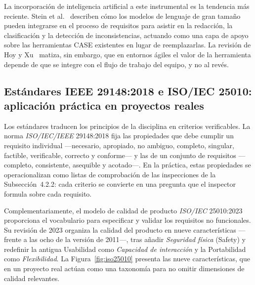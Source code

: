\documentclass[11pt,a4paper,oneside]{report}
\begin{document}
	La incorporaci\'on de inteligencia artificial a este instrumental es la tendencia m\'as reciente. Stein et al.~\citep{stein_llm_re_2026} describen c\'omo los modelos de lenguaje de gran tama\~no pueden integrarse en el proceso de requisitos para asistir en la redacci\'on, la clasificaci\'on y la detecci\'on de inconsistencias, actuando como una capa de apoyo sobre las herramientas CASE existentes en lugar de reemplazarlas. La revisi\'on de Hoy y Xu~\citep{hoy_agile_re_2023} matiza, sin embargo, que en entornos \'agiles el valor de la herramienta depende de que se integre con el flujo de trabajo del equipo, y no al rev\'es.
	
	\subsection{Est\'andares IEEE 29148:2018 e ISO/IEC 25010: aplicaci\'on pr\'actica en proyectos reales}
	
	Los est\'andares traducen los principios de la disciplina en criterios verificables. La norma \textit{ISO/IEC/IEEE} 29148:2018 \citep{iso29148_2018} fija las propiedades que debe cumplir un requisito individual ---necesario, apropiado, no ambiguo, completo, singular, factible, verificable, correcto y conforme--- y las de un conjunto de requisitos ---completo, consistente, asequible y acotado---. En la pr\'actica, estas propiedades se operacionalizan como listas de comprobaci\'on de las inspecciones de la Subsecci\'on~4.2.2: cada criterio se convierte en una pregunta que el inspector formula sobre cada requisito.
	
	Complementariamente, el modelo de calidad de producto \textit{ISO/IEC} 25010:2023 \citep{iso25010_2023} proporciona el vocabulario para especificar y validar los requisitos no funcionales. Su revisi\'on de 2023 organiza la calidad del producto en nueve caracter\'isticas ---frente a las ocho de la versi\'on de 2011---, tras a\~nadir \textit{Seguridad f\'isica} (Safety) y redefinir la antigua Usabilidad como \textit{Capacidad de interacci\'on} y la Portabilidad como \textit{Flexibilidad}. La Figura~\ref{fig:iso25010} presenta las nueve caracter\'isticas, que en un proyecto real act\'uan como una taxonom\'ia para no omitir dimensiones de calidad relevantes.
	
\end{document}
